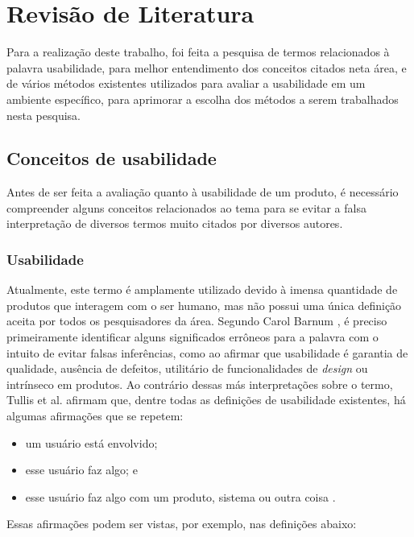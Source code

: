 \chapter{Revisão de Literatura}
\label{cap:revisao}

	Para a realização deste trabalho, foi feita a pesquisa de termos relacionados à palavra usabilidade, para melhor entendimento dos conceitos citados neta área, e de vários métodos existentes utilizados para avaliar a usabilidade em um ambiente específico, para aprimorar a escolha dos métodos a serem trabalhados nesta pesquisa. 

\section{Conceitos de usabilidade}
\label{sec:conceitos}
	Antes de ser feita a avaliação quanto à usabilidade de um produto, é necessário compreender alguns conceitos relacionados ao tema para se evitar a falsa interpretação de diversos termos muito citados por diversos autores.

\subsection{Usabilidade}
\label{sec:usabilidade}
	Atualmente, este termo é amplamente utilizado devido à imensa quantidade de produtos que interagem com o ser humano, mas não possui uma única definição aceita por todos os pesquisadores da área. Segundo Carol Barnum \cite{barnum:01}, é preciso primeiramente identificar alguns significados errôneos para a palavra com o intuito de evitar falsas inferências, como ao afirmar que usabilidade é garantia de qualidade, ausência de defeitos, utilitário de funcionalidades de \emph{design} ou intrínseco em produtos. Ao contrário dessas más interpretações sobre o termo, Tullis et al. \cite{tullis:13} afirmam que, dentre todas as definições de usabilidade existentes, há algumas afirmações que se repetem:

\begin{itemize}
\item  um usuário está envolvido;
\item  esse usuário faz algo; e
\item  esse usuário faz algo com um produto, sistema ou outra coisa \cite{tullis:13}.
\end{itemize}
Essas afirmações podem ser vistas, por exemplo, nas definições abaixo:


